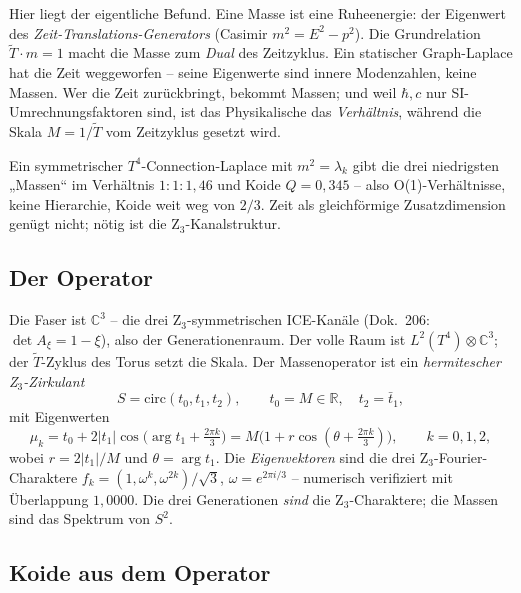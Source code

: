 Hier liegt der eigentliche Befund. Eine Masse ist eine Ruheenergie: der
Eigenwert des \emph{Zeit-Translations-Generators} (Casimir $m^2=E^2-p^2$). Die
Grundrelation $\tilde T\cdot m=1$ macht die Masse zum \emph{Dual} des
Zeitzyklus. Ein statischer Graph-Laplace hat die Zeit weggeworfen -- seine
Eigenwerte sind innere Modenzahlen, keine Massen. Wer die Zeit zurückbringt,
bekommt Massen; und weil $\hbar,c$ nur SI-Umrechnungsfaktoren sind, ist das
Physikalische das \emph{Verhältnis}, während die Skala $M=1/\tilde T$ vom
Zeitzyklus gesetzt wird.

\begin{warningboxenv}
Ein symmetrischer $T^4$-Connection-Laplace mit $m^2=\lambda_k$ gibt die drei
niedrigsten „Massen`` im Verhältnis $1{:}1{:}1{,}46$ und Koide $Q=0{,}345$ --
also O(1)-Verhältnisse, keine Hierarchie, Koide weit weg von $2/3$. Zeit als
gleichförmige Zusatzdimension genügt nicht; nötig ist die Z$_3$-Kanalstruktur.
\end{warningboxenv}

\subsection{Der Operator}

Die Faser ist $\mathbb{C}^3$ -- die drei Z$_3$-symmetrischen ICE-Kanäle
(Dok.~206: $\det A_\xi=1-\xi$), also der Generationenraum. Der volle Raum ist
$L^2(T^4)\otimes\mathbb{C}^3$; der $\tilde T$-Zyklus des Torus setzt die Skala.
Der Massenoperator ist ein \emph{hermitescher Z$_3$-Zirkulant}
\begin{equation}
  S=\mathrm{circ}(t_0,t_1,t_2),\qquad t_0=M\in\mathbb{R},\quad t_2=\bar t_1,
\end{equation}
mit Eigenwerten
\begin{equation}
  \mu_k = t_0 + 2|t_1|\cos\!\bigl(\arg t_1 + \tfrac{2\pi k}{3}\bigr)
        = M\bigl(1 + r\cos(\theta + \tfrac{2\pi k}{3})\bigr),
  \qquad k=0,1,2,
\end{equation}
wobei $r=2|t_1|/M$ und $\theta=\arg t_1$. Die \emph{Eigenvektoren} sind die
drei Z$_3$-Fourier-Charaktere $f_k=(1,\omega^k,\omega^{2k})/\sqrt3$,
$\omega=e^{2\pi i/3}$ -- numerisch verifiziert mit Überlappung $1{,}0000$. Die
drei Generationen \emph{sind} die Z$_3$-Charaktere; die Massen sind das
Spektrum von $S^2$.

\subsection{Koide aus dem Operator}

